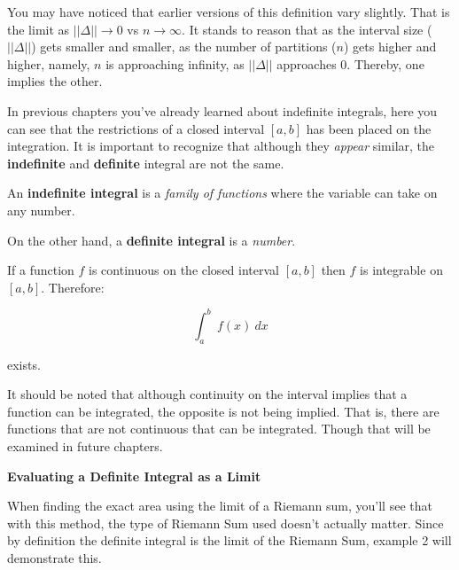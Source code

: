 \documentclass[12pt]{article}
\begin{document}
\bigskip

You may have noticed that earlier versions of this definition vary slightly. That is the limit as $ ||\Delta|| \to 0 $ vs $ n \to \infty $. It stands to reason that as the interval size ($||\Delta ||$) gets smaller and smaller, as the number of partitions ($n$) gets higher and higher, namely, $n$ is approaching infinity, as $||\Delta||$ approaches $0$. Thereby, one implies the other. 

\bigskip

In previous chapters you've already learned about indefinite integrals, here you can see that the restrictions of a closed interval $[a, b]$ has been placed on the integration. It is important to recognize that although they \textit{appear} similar, the \textbf{indefinite} and \textbf{definite} integral are not the same. 

\bigskip
\begin{center}
\noindent An \textbf{indefinite integral} is a \textit{family of functions} where the variable can take on any number. 
\bigskip

\noindent On the other hand, a \textbf{definite integral} is a \textit{number}.
\end{center}
\bigskip

\begin{tcolorbox}[colback = white!5!white, 
				  colframe = myblue,
				  colbacktitle = white!5!white,
				  drop shadow southeast, 
				  enhanced,
				  sharp corners = all, 
title =\color{mypink}\textbf{THEOREM 1 \color{black} Continuity Implies Integrability}]
If a function $f$ is continuous on the closed interval $[a,b]$ then $f$ is integrable on $[a, b]$. Therefore:

$$ \int^b_a \ f(x) \  dx$$ 

exists.

\end{tcolorbox}

\bigskip

It should be noted that although continuity on the interval implies that a function can be integrated, the opposite is not being implied. That is, there are functions that are not continuous that can be integrated. Though that will be examined in future chapters. 

\bigskip

\noindent \textbf{Evaluating a Definite Integral as a Limit}

\bigskip
When finding the exact area using the limit of a Riemann sum, you'll see that with this method, the type of Riemann Sum used doesn't actually matter. Since by definition the definite integral is the limit of the Riemann Sum, example 2 will demonstrate this. 
\end{document}
